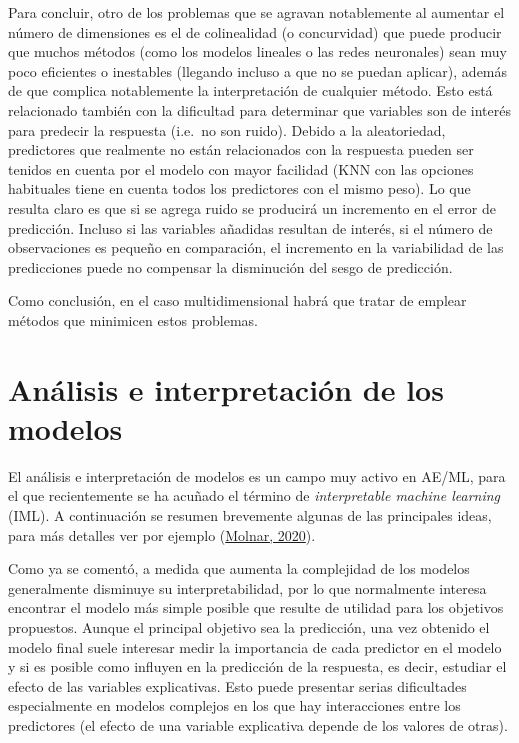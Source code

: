 \documentclass[
]{book}
\theoremstyle{break}
\theoremstyle{nonumberplain}
\begin{document}
Para concluir, otro de los problemas que se agravan notablemente al aumentar el número de dimensiones es el de colinealidad (o concurvidad) que puede producir que muchos métodos (como los modelos lineales o las redes neuronales) sean muy poco eficientes o inestables (llegando incluso a que no se puedan aplicar), además de que complica notablemente la interpretación de cualquier método.
Esto está relacionado también con la dificultad para determinar que variables son de interés para predecir la respuesta (i.e.~no son ruido).
Debido a la aleatoriedad, predictores que realmente no están relacionados con la respuesta pueden ser tenidos en cuenta por el modelo con mayor facilidad (KNN con las opciones habituales tiene en cuenta todos los predictores con el mismo peso).
Lo que resulta claro es que si se agrega ruido se producirá un incremento en el error de predicción.
Incluso si las variables añadidas resultan de interés, si el número de observaciones es pequeño en comparación, el incremento en la variabilidad de las predicciones puede no compensar la disminución del sesgo de predicción.

Como conclusión, en el caso multidimensional habrá que tratar de emplear métodos que minimicen estos problemas.

\hypertarget{analisis-modelos}{%
\section{Análisis e interpretación de los modelos}\label{analisis-modelos}}

El análisis e interpretación de modelos es un campo muy activo en AE/ML, para el que recientemente se ha acuñado el término de \emph{interpretable machine learning} (IML).
A continuación se resumen brevemente algunas de las principales ideas, para más detalles ver por ejemplo (\protect\hyperlink{ref-molnar2020interpretable}{Molnar, 2020}).

Como ya se comentó, a medida que aumenta la complejidad de los modelos generalmente disminuye su interpretabilidad, por lo que normalmente interesa encontrar el modelo más simple posible que resulte de utilidad para los objetivos propuestos.
Aunque el principal objetivo sea la predicción, una vez obtenido el modelo final suele interesar medir la importancia de cada predictor en el modelo y si es posible como influyen en la predicción de la respuesta, es decir, estudiar el efecto de las variables explicativas.
Esto puede presentar serias dificultades especialmente en modelos complejos en los que hay interacciones entre los predictores (el efecto de una variable explicativa depende de los valores de otras).
\end{document}
